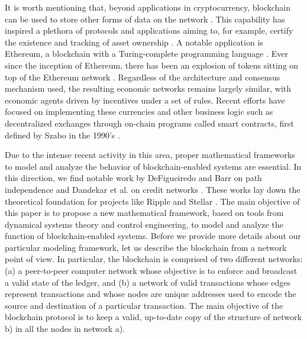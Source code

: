 \documentclass[letterpaper, 10 pt, conference]{ieeeconf}  %
\begin{document}
It is worth mentioning that, beyond applications in cryptocurrency, blockchain can be used to store other forms of data on the network \cite{bartoletti2017analysis}. This capability has inspired a plethora of protocols and applications aiming to, for example, certify the existence \cite{factom} and tracking of asset ownership \cite{omni-layer}. A notable application is Ethereum, a blockchain with a Turing-complete programming language \cite{buterin2014ethereum}. Ever since the inception of Ethereum, there has been an explosion of tokens sitting on top of the Ethereum network \cite{bat-token, zrx-token, gridplus-token}. Regardless of the architecture and consensus mechanism used, the resulting economic networks remains largely similar, with economic agents driven by incentives under a set of rules. Recent efforts have focused on implementing these currencies and other business logic such as decentralized exchanges through on-chain programs called smart contracts, first defined by Szabo in the 1990's \cite{szabo1994smart,szabo1996smart}. 

Due to the intense recent activity in this area, proper mathematical frameworks to model and analyze the behavior of blockchain-enabled systems are essential. In this direction, we find notable work by DeFigueiredo and Barr on path independence \cite{1524055} and Dandekar et al. on credit networks \cite{Dandekar:2011:LCN:1993574.1993597}. These works lay down the theoretical foundation for projects like Ripple \cite{schwartz2014ripple} and Stellar \cite{mazieres2015modeling}. The main objective of this paper is to propose a new mathematical framework, based on tools from dynamical systems theory and control engineering, to model and analyze the function of blockchain-enabled systems. Before we provide more details about our particular modeling framework, let us describe the blockchain from a network point of view. In particular, the blockchain is comprised of two different networks: (a) a peer-to-peer computer network whose objective is to enforce and broadcast a valid state of the ledger, and (b) a network of valid transactions whose edges represent transactions and whose nodes are unique addresses used to encode the source and destination of a particular transaction. The main objective of the blockchain protocol is to keep a valid, up-to-date copy of the structure of network b) in all the nodes in network a).
\end{document}
